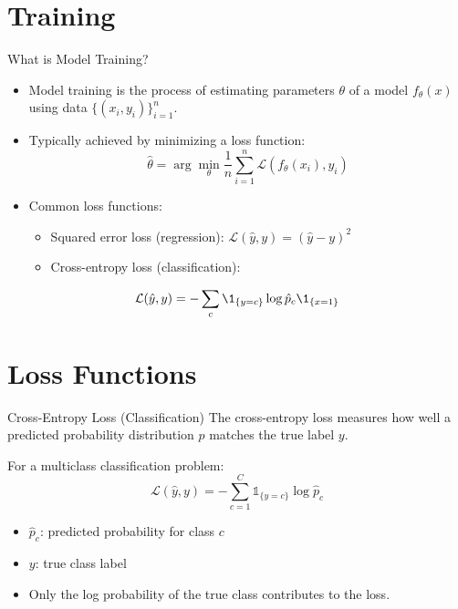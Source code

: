 \documentclass[aspectratio=169]{beamer}
\begin{document}
\section{Training}
\label{sec:org9811b6d}
\begin{frame}[label={sec:orgfcdaea7}]{What is Model Training?}
\begin{itemize}
\item Model training is the process of estimating parameters \(\theta\) of a model \(f_\theta(x)\) using data \(\{(x_i, y_i)\}_{i=1}^n\).
\item Typically achieved by minimizing a loss function:
\begin{equation}
\hat{\theta} = \arg\min_\theta \frac{1}{n} \sum_{i=1}^n \mathcal{L}(f_\theta(x_i), y_i)
\end{equation}
\item Common loss functions:
\begin{itemize}
\item \alert{\alert{Squared error loss}} (regression): \(\mathcal{L}(\hat{y}, y) = (\hat{y} - y)^2\)
\item \alert{\alert{Cross-entropy loss}} (classification):
\end{itemize}
\end{itemize}
\begin{equation}
    \mathcal{L}(\hat{y}, y) = -\sum_{c} \1_{\{y = c\}} \log \hat{p}_c
\1_{\{x = 1\}}
\end{equation}
\end{frame}


\section{Loss Functions}
\label{sec:orgcf16470}
\begin{frame}[label={sec:orgda7d3f1}]{Cross-Entropy Loss (Classification)}
The cross-entropy loss measures how well a predicted probability
distribution \(\hat{p}\) matches the true label \(y\).

For a multiclass classification problem:
\begin{equation}
\mathcal{L}(\hat{y}, y) = -\sum_{c=1}^C \mathds{1}_{\{y = c\}} \log \hat{p}_c
\end{equation}

\begin{itemize}
\item \(\hat{p}_c\): predicted probability for class \(c\)
\item \(y\): true class label
\item Only the log probability of the true class contributes to the loss.
\end{itemize}
\end{frame}
\end{document}

